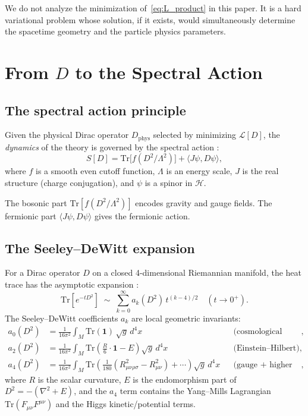 \documentclass[12pt]{article}
\theoremstyle{definition}
\theoremstyle{remark}
\newcommand{\Tr}{\mathrm{Tr}}
\begin{document}
We do not analyze the minimization of~\eqref{eq:L_product} in this paper.
It is a hard variational problem whose solution, if it exists,
would simultaneously determine the spacetime geometry and the
particle physics parameters.

\section{From $D$ to the Spectral Action}
\label{sec:spectral_action}

\subsection{The spectral action principle}

Given the physical Dirac operator $D_{\mathrm{phys}}$ selected by
minimizing $\mathcal{L}[D]$, the \emph{dynamics} of the theory is
governed by the spectral action \cite{ConnesChamseddine1997}:
\begin{equation}\label{eq:spec_action}
  S[D] = \Tr\bigl[f(D^2/\Lambda^2)\bigr]
       + \langle J\psi, D\psi\rangle,
\end{equation}
where $f$ is a smooth even cutoff function, $\Lambda$ is an energy
scale, $J$ is the real structure (charge conjugation), and $\psi$
is a spinor in $\mathcal{H}$.

The bosonic part $\Tr[f(D^2/\Lambda^2)]$ encodes gravity and gauge
fields.  The fermionic part $\langle J\psi, D\psi\rangle$ gives
the fermionic action.

\subsection{The Seeley--DeWitt expansion}

For a Dirac operator $D$ on a closed 4-dimensional Riemannian manifold,
the heat trace has the asymptotic expansion \cite{Vassilevich2003}:
\begin{equation}\label{eq:heat_trace}
  \Tr[e^{-tD^2}]
  \;\sim\; \sum_{k=0}^\infty a_k(D^2)\,t^{(k-4)/2}
  \quad (t \to 0^+).
\end{equation}
The Seeley--DeWitt coefficients $a_k$ are local geometric invariants:
\begin{align}
  a_0(D^2) &= \frac{1}{16\pi^2}\int_M \Tr(\mathbf{1})\,\sqrt{g}\,d^4x
  &&\text{(cosmological constant)},\label{eq:a0}\\[4pt]
  a_2(D^2) &= \frac{1}{16\pi^2}\int_M \Tr\!\left(\tfrac{R}{6}\cdot\mathbf{1}
              - E\right)\sqrt{g}\,d^4x
  &&\text{(Einstein--Hilbert)},\label{eq:a2}\\[4pt]
  a_4(D^2) &= \frac{1}{16\pi^2}\int_M \Tr\!\left(
    \tfrac{1}{180}(R_{\mu\nu\rho\sigma}^2 - R_{\mu\nu}^2)
    + \cdots\right)\sqrt{g}\,d^4x
  &&\text{(gauge + higher curvature)},\label{eq:a4}
\end{align}
where $R$ is the scalar curvature, $E$ is the endomorphism part of
$D^2 = -(\nabla^2 + E)$, and the $a_4$ term contains the
Yang--Mills Lagrangian $\Tr(F_{\mu\nu}F^{\mu\nu})$ and the Higgs
kinetic/potential terms.
\end{document}
